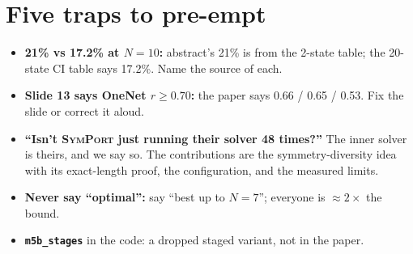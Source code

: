 \documentclass[10.5pt,a4paper]{article}
\newcommand{\M}[1]{\textsc{#1}}
\begin{document}
\section{Five traps to pre-empt}
\begin{warnbox}
\begin{itemize}
\item \textbf{21\% vs 17.2\% at $N=10$:} abstract's 21\% is from the 2-state table; the 20-state CI table says 17.2\%. Name the
source of each.
\item \textbf{Slide 13 says OneNet $r\ge0.70$:} the paper says 0.66 / 0.65 / 0.53. Fix the slide or correct it aloud.
\item \textbf{``Isn't \M{SymPort} just running their solver 48 times?''} The inner solver is theirs, and we say so. The
contributions are the symmetry-diversity idea with its exact-length proof, the configuration, and the measured limits.
\item \textbf{Never say ``optimal'':} say ``best up to $N=7$''; everyone is $\approx2\times$ the bound.
\item \textbf{\texttt{m5b\_stages}} in the code: a dropped staged variant, not in the paper.
\end{itemize}
\end{warnbox}
\end{document}
